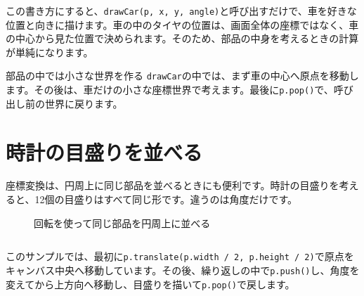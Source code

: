 この書き方にすると、\texttt{drawCar(p, x, y, angle)}と呼び出すだけで、車を好きな位置と向きに描けます。車の中のタイヤの位置は、画面全体の座標ではなく、車の中心から見た位置で決められます。そのため、部品の中身を考えるときの計算が単純になります。

\begin{notebox}{部品の中では小さな世界を作る}
\texttt{drawCar}の中では、まず車の中心へ原点を移動します。その後は、車だけの小さな座標世界で考えます。最後に\texttt{p.pop()}で、呼び出し前の世界に戻ります。
\end{notebox}

\section{時計の目盛りを並べる}

座標変換は、円周上に同じ部品を並べるときにも便利です。時計の目盛りを考えると、12個の目盛りはすべて同じ形です。違うのは角度だけです。

\begin{figure}[htbp]
    \centering
    \caption{回転を使って同じ部品を円周上に並べる}
    \label{fig:chapter09-clock-marks}
\end{figure}

\begin{listing}[htbp]
\inputminted{ts}{typescript-p5/listings/chapter09/clock-marks.ts}
\caption{座標変換で時計の目盛りを描く（\texttt{chapter09/clock-marks.ts}）}
\label{lst:chapter09-clock-marks}
\end{listing}

このサンプルでは、最初に\texttt{p.translate(p.width / 2, p.height / 2)}で原点をキャンバス中央へ移動しています。その後、繰り返しの中で\texttt{p.push()}し、角度を変えてから上方向へ移動し、目盛りを描いて\texttt{p.pop()}で戻します。

